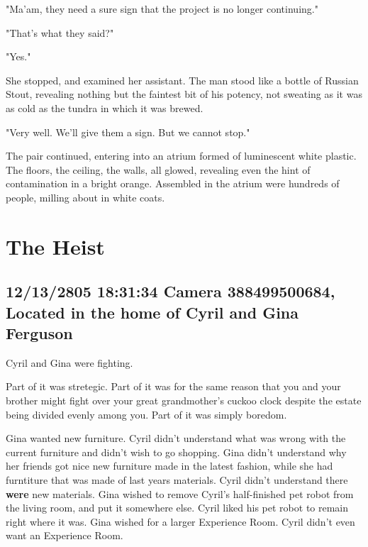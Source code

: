 \documentclass[12pt]{article}
\begin{document}
"Ma'am, they need a sure sign that the project is no longer continuing."

"That's what they said?"

"Yes."

She stopped, and examined her assistant. The man stood like a bottle of Russian Stout, revealing nothing but the faintest bit of his potency, not sweating as it was as cold as the tundra in which it was brewed.

"Very well. We'll give them a sign. But we cannot stop."

The pair continued, entering into an atrium formed of luminescent white plastic. The floors, the ceiling, the walls, all glowed, revealing even the hint of contamination in a bright orange. Assembled in the atrium were hundreds of people, milling about in white coats. 

\section*{The Heist}
\label{sec:orge40a3d0}

\subsection*{12/13/2805 18:31:34 Camera 388499500684, Located in the home of Cyril and Gina Ferguson}
\label{sec:org32d318b}

Cyril and Gina were fighting. 

Part of it was stretegic. Part of it was for the same reason that you and your brother might fight over your great grandmother's cuckoo clock despite the estate being divided evenly among you. Part of it was simply boredom.

Gina wanted new furniture. Cyril didn't understand what was wrong with the current furniture and didn't wish to go shopping. Gina didn't understand why her friends got nice new furniture made in the latest fashion, while she had furntiture that was made of last years materials. Cyril didn't understand there \textbf{were} new materials. Gina wished to remove Cyril's half-finished pet robot from the living room, and put it somewhere else. Cyril liked his pet robot to remain right where it was. Gina wished for a larger Experience Room. Cyril didn't even want an Experience Room.
\end{document}
